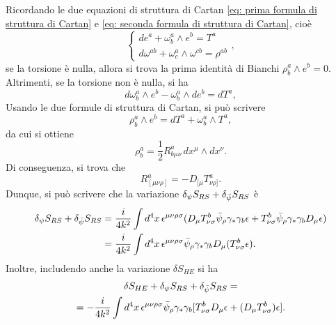 Ricordando le due equazioni di struttura di Cartan \eqref{eq: prima formula di struttura di Cartan} e \eqref{eq: seconda formula di struttura di Cartan}, cioè 
\begin{equation}
    \begin{cases}
        de^a + \omega_b^a \wedge e^b = T^a \\ 
        d\omega^{ab} + \omega^a_c \wedge \omega^{cb} = \rho^{ab}  
    \end{cases},
\end{equation}
se la torsione è nulla, allora si trova la prima identità di Bianchi $\rho^a_b \wedge e^b = 0$. Altrimenti, se la torsione non è nulla, si ha 
\begin{equation}
    d\omega^a_b \wedge e^b - \omega^a_b \wedge de^b = dT^a,
\end{equation}
Usando le due formule di struttura di Cartan, si può scrivere 
\begin{equation}
    \rho^a_b \wedge e^b = dT^a + \omega^a_b \wedge T^a,
\end{equation}
da cui si ottiene
\begin{equation}
    \rho^a_b = \frac{1}{2}R^a_{b\mu\nu}\,dx^\mu \wedge dx^\nu.
\end{equation}
Di conseguenza, si trova che  
\begin{equation}
    R^a_{[\mu\nu\rho]} = -D_{[\mu}T^a_{\nu\rho]}.
\end{equation}
Dunque, si può scrivere che la variazione $\delta_\psi S_{RS} + \delta_{\bar{\psi}} S_{RS}$ è
\begin{equation}
    \begin{split}
        \delta_\psi S_{RS} + \delta_{\bar{\psi}} S_{RS} &= \frac{i}{4k^2}\int d^4x\,\epsilon^{\mu\nu\rho\sigma}(D_\mu T^b_{\nu\sigma}\bar{\psi}_\rho\gamma_*\gamma_b\epsilon + T^b_{\nu\sigma}\bar{\psi}_\rho\gamma_*\gamma_bD_\mu\epsilon) \\
        &= \frac{i}{4k^2}\int d^4x\,\epsilon^{\mu\nu\rho\sigma}\bar{\psi}_\rho\gamma_*\gamma_bD_\mu(T^b_{\nu\sigma}\epsilon).
    \end{split}
\end{equation}
Inoltre, includendo anche la variazione $\delta S_{HE}$ si ha
\begin{multline}
    \delta S_{HE} + \delta_\psi S_{RS} + \delta_{\bar{\psi}} S_{RS} = \\ = -\frac{i}{4k^2}\int d^4x\,\epsilon^{\mu\nu\rho\sigma}\bar{\psi}_\rho\gamma_*\gamma_b[T^b_{\nu\sigma}D_\mu\epsilon + (D_\mu T^b_{\nu\sigma})\epsilon].
\end{multline}
